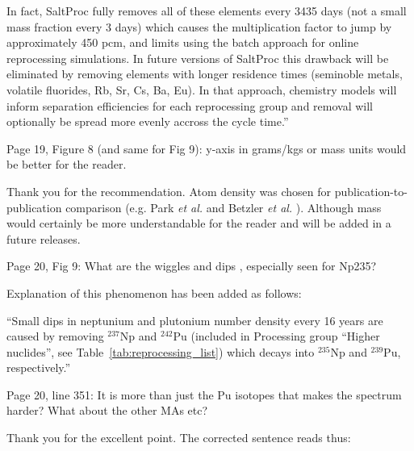 \documentclass[answers,11pt]{exam}
\begin{document}
\begin{questions}
\begin{solution}
                        In fact, SaltProc fully removes
                        all of these elements every 3435 days (not a small mass fraction every 3 days)
                        which causes the multiplication factor to jump by approximately 450
                        pcm, and limits using the batch approach for online reprocessing simulations.
                        In future versions of SaltProc this drawback will be eliminated by removing
                        elements with longer residence times (seminoble metals, volatile fluorides, Rb, Sr,
                         Cs, Ba, Eu). In that approach, chemistry models will inform separation
                         efficiencies for each reprocessing group and removal will optionally be spread more
                         evenly accross the cycle time.''
        \end{solution}

        \question  Page 19, Figure 8 (and same for Fig 9): y-axis in grams/kgs 
        or mass units would be better for the reader.
        \begin{solution}
                Thank you for the recommendation. Atom density was chosen for publication-to-						publication comparison (e.g. Park \emph{et al.} and Betzler \emph{et al.}
                \cite{park_whole_2015, betzler_molten_2017}). Although mass would certainly 
                be more understandable for the reader and will be added in a future releases.
        \end{solution}

        \question  Page 20, Fig 9: What are the wiggles and dips , especially 
        seen for Np235?
        \begin{solution}
		        Explanation of this phenomenon has been added as follows:

                          ``Small dips in neptunium and plutonium number density 
                          every 16 years are caused by removing $^{237}$Np and 
                          $^{242}$Pu (included in Processing group ``Higher 
                          nuclides'', see Table~\ref{tab:reprocessing_list}) 
                          which decays into $^{235}$Np and $^{239}$Pu, 
                          respectively.''
        \end{solution}

        \question  Page 20, line 351: It is more than just the Pu isotopes that 
        makes the spectrum harder? What about the other MAs etc?
        \begin{solution}
        		Thank you for the excellent point. The corrected sentence reads thus: 
        

\end{solution}
\end{questions}
\end{document}

